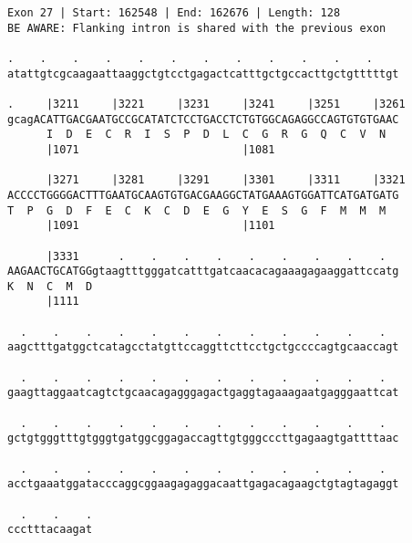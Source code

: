 \documentclass{article}
\begin{document}
\begin{Verbatim}[fontfamily=courier]
Exon 27 | Start: 162548 | End: 162676 | Length: 128
BE AWARE: Flanking intron is shared with the previous exon

.    .    .    .    .    .    .    .    .    .    .    .    
atattgtcgcaagaattaaggctgtcctgagactcatttgctgccacttgctgtttttgt

.     |3211     |3221     |3231     |3241     |3251     |3261
gcagACATTGACGAATGCCGCATATCTCCTGACCTCTGTGGCAGAGGCCAGTGTGTGAAC
      I  D  E  C  R  I  S  P  D  L  C  G  R  G  Q  C  V  N  
      |1071                         |1081                   

      |3271     |3281     |3291     |3301     |3311     |3321
ACCCCTGGGGACTTTGAATGCAAGTGTGACGAAGGCTATGAAAGTGGATTCATGATGATG
T  P  G  D  F  E  C  K  C  D  E  G  Y  E  S  G  F  M  M  M  
      |1091                         |1101                   

      |3331      .    .    .    .    .    .    .    .    .  
AAGAACTGCATGGgtaagtttgggatcatttgatcaacacagaaagagaaggattccatg
K  N  C  M  D                                               
      |1111                                                 

  .    .    .    .    .    .    .    .    .    .    .    .  
aagctttgatggctcatagcctatgttccaggttcttcctgctgccccagtgcaaccagt

  .    .    .    .    .    .    .    .    .    .    .    .  
gaagttaggaatcagtctgcaacagagggagactgaggtagaaagaatgagggaattcat

  .    .    .    .    .    .    .    .    .    .    .    .  
gctgtgggtttgtgggtgatggcggagaccagttgtgggcccttgagaagtgattttaac

  .    .    .    .    .    .    .    .    .    .    .    .  
acctgaaatggatacccaggcggaagagaggacaattgagacagaagctgtagtagaggt

  .    .    .
ccctttacaagat
\end{Verbatim}
\newpage
\end{document}

